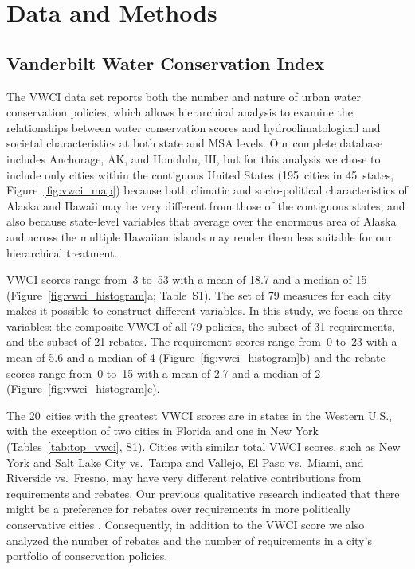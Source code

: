 \documentclass[draft,linenumbers]{agujournal}\usepackage{knitr}
\begin{document}
\section{Data and Methods}
\label{sec:data.methods}
\subsection{Vanderbilt Water Conservation Index}
%
%
%

%
%



The VWCI data set reports both the number and
nature of urban water conservation policies, which  allows hierarchical analysis
to examine the relationships between water conservation scores and
hydroclimatological and societal characteristics at both state and MSA levels.
Our complete database includes Anchorage, AK, and Honolulu, HI, but for this
analysis we chose to include only cities within the contiguous United States
(195~cities in 45~states,
Figure~\ref{fig:vwci_map})
because both
climatic and socio-political characteristics of Alaska and Hawaii may be very
different from those of the contiguous states, and also because state-level
variables that average over the enormous area of Alaska and across the multiple
Hawaiian islands may render them less suitable for our hierarchical treatment.

VWCI scores range from~3
to~53
with a mean of  18.7
and a median of 15
(Figure~\ref{fig:vwci_histogram}a; Table~S1).
The set of 79 measures for each city makes it possible to construct different variables.
In this study, we focus on three variables: the composite VWCI of all 79 policies,
the subset of 31 requirements, and the subset of 21 rebates.
The requirement scores range
from~0
to~23
with a mean of 5.6
and a median of 4
(Figure~\ref{fig:vwci_histogram}b)
and the rebate scores range
from~0
to~15
with a mean of 2.7
and a median of 2
(Figure~\ref{fig:vwci_histogram}c).
%
%

The 20~cities with the greatest VWCI scores are in states in the
Western U.S., with the exception of two cities in Florida and one in New York
(Tables~\ref{tab:top_vwci}, S1). Cities with similar total VWCI scores, such as
New York and Salt Lake City vs.\ Tampa and Vallejo, El Paso vs.\ Miami, and
Riverside vs.\ Fresno, may have very different relative contributions from
requirements and rebates.
Our previous qualitative research
indicated that there might be a preference for rebates over requirements in more
politically conservative cities \citep{hess:drought:2016,brown:politics:2016}.
Consequently, in addition to the VWCI score we also analyzed the number of
rebates and the number of requirements in a city's portfolio of conservation
policies.
\end{document}
